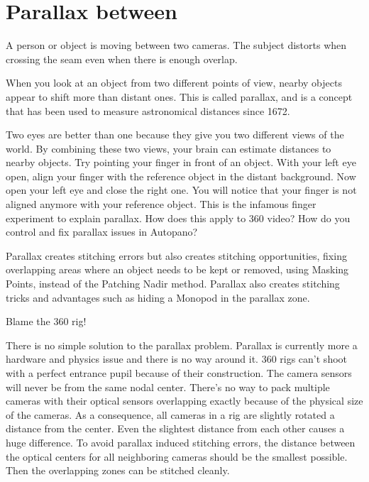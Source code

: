 \chapter{Parallax between }
\pagecolor{white}
\label{chap:37}
\begin{fullwidth}

\problem

{\large A person or object is moving between two cameras. The subject distorts when crossing the seam even when there is enough overlap. \par}

When you look at an object from two different points of view, nearby objects appear to shift more than distant ones. This is called parallax, and is a concept that has been used to measure astronomical distances since 1672.


Two eyes are better than one because they give you two different views of the world. By combining these two views, your brain can estimate distances to nearby objects. Try pointing your finger in front of an object. With your left eye open, align your finger with the reference object in the distant background. Now open your left eye and close the right one. You will notice that your finger is not aligned anymore with your reference object. This is the infamous finger experiment to explain parallax. How does this apply to 360 video? How do you control and fix parallax issues in Autopano?

\solutions

Parallax creates stitching errors but also creates stitching opportunities, fixing overlapping areas where an object needs to be kept or removed, using Masking Points, instead of the Patching Nadir method. Parallax also creates stitching tricks and advantages such as hiding a Monopod in the parallax zone.

{\large Blame the 360 rig! \par}

There is no simple solution to the parallax problem. Parallax is currently more a hardware and physics issue and there is no way around it. 360 rigs can't shoot with a perfect entrance pupil because of their construction. The camera sensors will never be from the same nodal center. There’s no way to pack multiple cameras with their optical sensors overlapping exactly because of the physical size of the cameras. As a consequence, all cameras in a rig are slightly rotated a distance from the center. Even the slightest distance from each other causes a huge difference. To avoid parallax induced stitching errors, the distance between the optical centers for all neighboring cameras should be the smallest possible. Then the overlapping zones can be stitched cleanly. 


\end{fullwidth}
